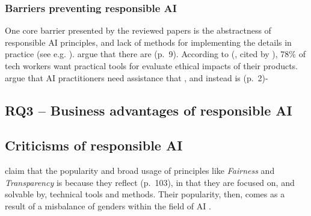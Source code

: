 \subsubsection{Barriers preventing responsible AI}
One core barrier presented by the reviewed papers is the abstractness of responsible AI principles, and lack of methods for implementing the details in practice (see e.g. \cite{Gianni_2022,Havrda_2020}). \textcite{Gianni_2022} argue that there are  (p.~9). According to (\cite{Miller_2019_techworker}, cited by \cite{Morley_2020}), 78\% of tech workers want practical tools for evaluate ethical impacts of their products. \textcite{Morley_2021} argue that AI practitioners need assistance that , and instead is  (p.~2)-


\subsection{RQ3 -- Business advantages of responsible AI}
\label{sec:results-rq3:advantages}



\subsection{Criticisms of responsible AI}
\label{sec:results-criticism}



\textcite{Hagendorff_2020} claim that the popularity and broad usage of principles like \textit{Fairness} and \textit{Transparency} is because they reflect  (p.~103), in that they are focused on, and solvable by, technical tools and methods. Their popularity, then, comes as a result of a misbalance of genders within the field of AI \parencite{Hagendorff_2020}.